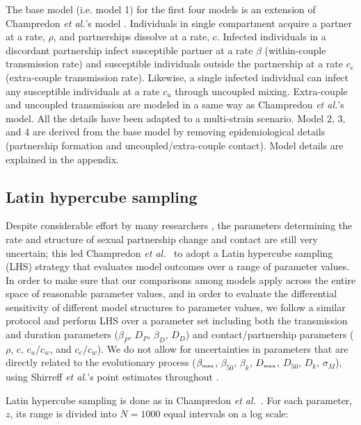 \documentclass[10pt,letterpaper]{article}
\newcommand{\etal}{\textit{et al.}}
\newcommand{\tsub}[2]{#1_{{\textrm{\tiny #2}}}}
\begin{document}
The base model (i.e. model 1) for the first four models is an extension of Champredon \etal's model \cite{champredon_hiv_2013}. Individuals in single compartment acquire a partner at a rate, $\rho$, and partnerships dissolve at a rate, $c$. Infected individuals in a discordant partnership infect susceptible partner at a rate $\beta$ (within-couple transmission rate) and susceptible individuals outside the partnership at a rate $c_e$ (extra-couple transmission rate). Likewise, a single infected individual can infect any susceptible individuals at a rate $c_u$ through uncoupled mixing. Extra-couple and uncoupled transmission are modeled in a same way as Champredon \etal's model. All the details have been adapted to a multi-strain scenario. Model 2, 3, and 4 are derived from the base model by removing epidemiological details (partnership formation and uncoupled/extra-couple contact). Model details are explained in the appendix.


\subsection*{Latin hypercube sampling}

Despite considerable effort by many researchers \cite{hollingsworth_hiv1_2008,champredon_hiv_2013}, the parameters determining the rate and structure of sexual partnership change and contact are still very uncertain; this led Champredon \etal\ \cite{champredon_hiv_2013} to adopt a Latin hypercube sampling (LHS) strategy \cite{blower_drugs_1991} that evaluates model outcomes over a range of parameter values. In order to make sure that our comparisons among models apply across the entire space of reasonable parameter values, and in order to evaluate the differential sensitivity of different model structures to parameter values, we follow a similar protocol and perform LHS over a parameter set including both the transmission and duration parameters ($\beta_P$, $D_P$, $\beta_D$, $D_D$) and contact/partnership parameters ($\rho$, $c$, $c_u/c_w$, and $c_e/c_w$). We do not allow for uncertainties in parameters that are directly related to the evolutionary process ($\tsub{\beta}{max}$, $\beta_{50}$, $\beta_k$, $\tsub{D}{max}$, $D_{50}$, $D_k$, $\sigma_M$), using Shirreff \etal's point estimates throughout \cite{shirreff_transmission_2011}.

Latin hypercube sampling is done as in Champredon \etal\ \cite{champredon_hiv_2013}. For each parameter, $z$, its range is divided into $N = 1000$ equal intervals on a log scale:
\end{document}
